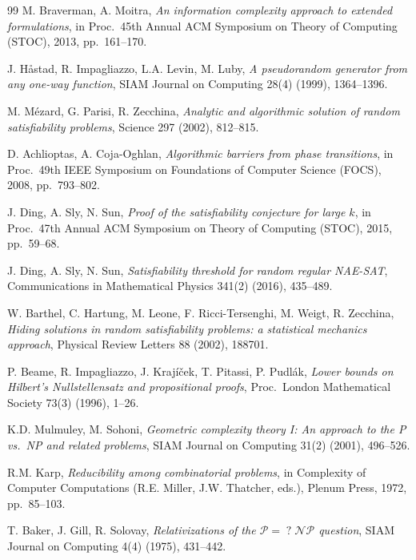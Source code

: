 \documentclass[11pt]{article}
\theoremstyle{definition}
\theoremstyle{remark}
\begin{document}
\begin{thebibliography}{99}
  M. Braverman, A. Moitra,
  \textit{An information complexity approach to extended formulations},
  in Proc.\ 45th Annual ACM Symposium on Theory of Computing (STOC), 2013, pp.\ 161--170.

  J. H\aa stad, R. Impagliazzo, L.A. Levin, M. Luby,
  \textit{A pseudorandom generator from any one-way function},
  SIAM Journal on Computing 28(4) (1999), 1364--1396.

  M. M\'ezard, G. Parisi, R. Zecchina,
  \textit{Analytic and algorithmic solution of random satisfiability problems},
  Science 297 (2002), 812--815.

  D. Achlioptas, A. Coja-Oghlan,
  \textit{Algorithmic barriers from phase transitions},
  in Proc.\ 49th IEEE Symposium on Foundations of Computer Science (FOCS), 2008, pp.\ 793--802.

  J. Ding, A. Sly, N. Sun,
  \textit{Proof of the satisfiability conjecture for large $k$},
  in Proc.\ 47th Annual ACM Symposium on Theory of Computing (STOC), 2015, pp.\ 59--68.

  J. Ding, A. Sly, N. Sun,
  \textit{Satisfiability threshold for random regular NAE-SAT},
  Communications in Mathematical Physics 341(2) (2016), 435--489.

  W. Barthel, C. Hartung, M. Leone, F. Ricci-Tersenghi, M. Weigt, R. Zecchina,
  \textit{Hiding solutions in random satisfiability problems: a statistical mechanics approach},
  Physical Review Letters 88 (2002), 188701.

  P. Beame, R. Impagliazzo, J. Kraj\'i\v{c}ek, T. Pitassi, P. Pudl\'ak,
  \textit{Lower bounds on Hilbert's Nullstellensatz and propositional proofs},
  Proc.\ London Mathematical Society 73(3) (1996), 1--26.

  K.D. Mulmuley, M. Sohoni,
  \textit{Geometric complexity theory I: An approach to the P vs.\ NP and related problems},
  SIAM Journal on Computing 31(2) (2001), 496--526.

  R.M. Karp,
  \textit{Reducibility among combinatorial problems},
  in Complexity of Computer Computations (R.E. Miller, J.W. Thatcher, eds.),
  Plenum Press, 1972, pp.\ 85--103.

  T. Baker, J. Gill, R. Solovay,
  \textit{Relativizations of the $\mathcal{P} =\;?\; \mathcal{NP}$ question},
  SIAM Journal on Computing 4(4) (1975), 431--442.


\end{thebibliography}
\end{document}

